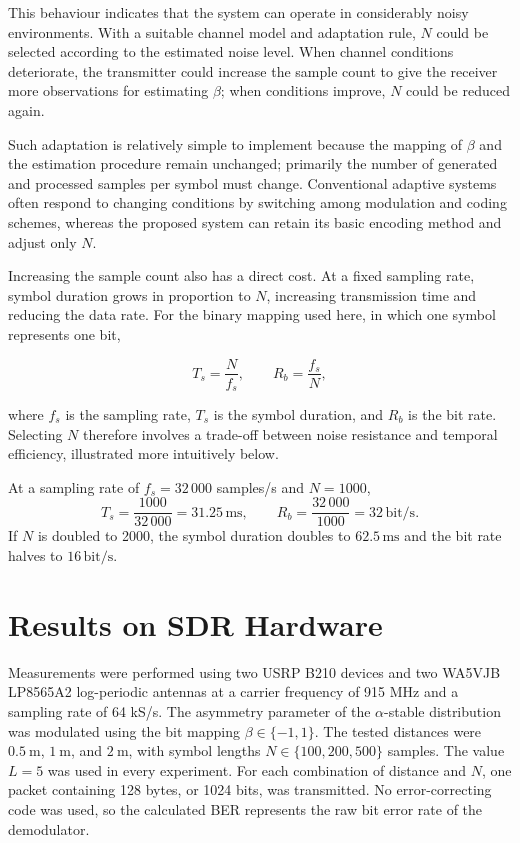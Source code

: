 \documentclass[a4paper, 12pt, openany]{book}
\begin{document}
This behaviour indicates that the system can operate in considerably noisy environments. With a suitable channel model and adaptation rule, $N$ could be selected according to the estimated noise level. When channel conditions deteriorate, the transmitter could increase the sample count to give the receiver more observations for estimating $\beta$; when conditions improve, $N$ could be reduced again.

Such adaptation is relatively simple to implement because the mapping of $\beta$ and the estimation procedure remain unchanged; primarily the number of generated and processed samples per symbol must change. Conventional adaptive systems often respond to changing conditions by switching among modulation and coding schemes, whereas the proposed system can retain its basic encoding method and adjust only $N$.

Increasing the sample count also has a direct cost. At a fixed sampling rate, symbol duration grows in proportion to $N$, increasing transmission time and reducing the data rate. For the binary mapping used here, in which one symbol represents one bit,

\begin{equation}
T_s=\frac{N}{f_s},
\qquad
R_b=\frac{f_s}{N},
\end{equation}

where $f_s$ is the sampling rate, $T_s$ is the symbol duration, and $R_b$ is the bit rate. Selecting $N$ therefore involves a trade-off between noise resistance and temporal efficiency, illustrated more intuitively below.

\begin{tcolorbox}[colback=purple!5!white,colframe=purple!50!black,
title=Example: effect of sample count on transmission rate]
At a sampling rate of $f_s=32\,000$ samples/s and $N=1000$,
\[
T_s=\frac{1000}{32\,000}=31.25\,\mathrm{ms},
\qquad
R_b=\frac{32\,000}{1000}=32\,\mathrm{bit/s}.
\]
If $N$ is doubled to 2000, the symbol duration doubles to $62.5\,\mathrm{ms}$ and the bit rate halves to $16\,\mathrm{bit/s}$.
\end{tcolorbox}

\section{Results on SDR Hardware}

Measurements were performed using two USRP B210 devices and two WA5VJB LP8565A2 log-periodic antennas at a carrier frequency of 915 MHz and a sampling rate of 64 kS/s. The asymmetry parameter of the $\alpha$-stable distribution was modulated using the bit mapping $\beta\in\{-1,1\}$. The tested distances were $0.5~\mathrm{m}$, $1~\mathrm{m}$, and $2~\mathrm{m}$, with symbol lengths $N\in\{100,200,500\}$ samples. The value $L=5$ was used in every experiment. For each combination of distance and $N$, one packet containing 128 bytes, or 1024 bits, was transmitted. No error-correcting code was used, so the calculated BER represents the raw bit error rate of the demodulator.
\end{document}
